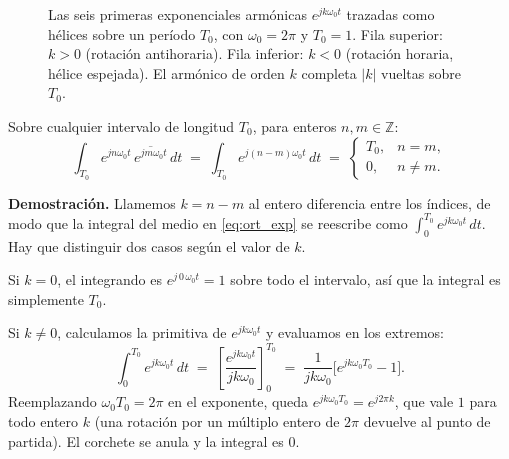 \documentclass[class=book, crop=false]{standalone}
\begin{document}
\begin{figure}[H]
    \centering
    \begin{minipage}{\linewidth}
        \centering
        
        \caption{Las seis primeras exponenciales armónicas $e^{jk\omega_0 t}$
                 trazadas como hélices sobre un período $T_0$, con
                 $\omega_0 = 2\pi$ y $T_0 = 1$. Fila superior: $k > 0$
                 (rotación antihoraria). Fila inferior: $k < 0$ (rotación
                 horaria, hélice espejada). El armónico de orden $k$
                 completa $|k|$ vueltas sobre $T_0$.}
        \label{fig:exponenciales_armonicas}
    \end{minipage}
\end{figure}

\begin{resultado}
Sobre cualquier intervalo de longitud $T_0$, para enteros $n, m \in \mathbb{Z}$:
\begin{equation}
    \int_{T_0} e^{jn\omega_0 t}\,\overline{e^{jm\omega_0 t}}\,dt
    \;=\; \int_{T_0} e^{j(n-m)\omega_0 t}\,dt
    \;=\;
    \begin{cases}
        T_0, & n = m, \\
        0,   & n \neq m.
    \end{cases}
    \label{eq:ort_exp}
\end{equation}
\end{resultado}

\textbf{Demostración.}
Llamemos $k = n - m$ al entero diferencia entre los índices, de modo
que la integral del medio en \eqref{eq:ort_exp} se reescribe como
$\int_0^{T_0} e^{jk\omega_0 t}\,dt$. Hay que distinguir dos casos según
el valor de $k$.

Si $k = 0$, el integrando es $e^{j\,0\,\omega_0 t} = 1$ sobre todo el
intervalo, así que la integral es simplemente $T_0$.

Si $k \neq 0$, calculamos la primitiva de $e^{jk\omega_0 t}$ y
evaluamos en los extremos:
\begin{equation*}
    \int_0^{T_0} e^{jk\omega_0 t}\,dt
    \;=\; \left[\frac{e^{jk\omega_0 t}}{jk\omega_0}\right]_0^{T_0}
    \;=\; \frac{1}{jk\omega_0}\bigl[e^{jk\omega_0 T_0} - 1\bigr].
\end{equation*}
Reemplazando $\omega_0 T_0 = 2\pi$ en el exponente, queda
$e^{jk\omega_0 T_0} = e^{j2\pi k}$, que vale $1$ para todo entero $k$
(una rotación por un múltiplo entero de $2\pi$ devuelve al punto de
partida). El corchete se anula y la integral es $0$.
\end{document}
